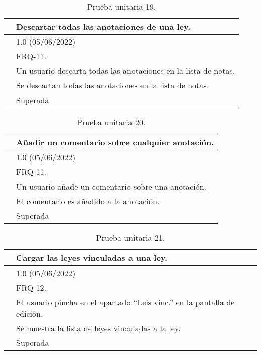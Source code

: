 \begin{table}[H]
\begin{center}
\begin{tabular}{|p{3cm}|p{10cm}|} \hline
\centering {\bf PU-19} & Descartar todas las anotaciones de una ley.  \\ \hline\hline
\centering {\bf Versión} & 1.0 (05/06/2022) \\ \hline
\centering {\bf Dependencias} & FRQ-11. \\ \hline
\centering {\bf Descripción} &  Un usuario descarta todas las anotaciones en la lista de notas. \\ \hline
\centering {\bf Criterio de aceptación} & Se descartan todas las anotaciones en la lista de notas. \\ \hline
\centering {\bf Estado} & Superada \\ \hline
\end{tabular}
\caption{Prueba unitaria 19.}
\label{enlacePU19}
\end{center}
\end{table}

\begin{table}[H]
\begin{center}
\begin{tabular}{|p{3cm}|p{10cm}|} \hline
\centering {\bf PU-20} & Añadir un comentario sobre cualquier anotación.  \\ \hline\hline
\centering {\bf Versión} & 1.0 (05/06/2022) \\ \hline
\centering {\bf Dependencias} & FRQ-11. \\ \hline
\centering {\bf Descripción} &  Un usuario añade un comentario sobre una anotación. \\ \hline
\centering {\bf Criterio de aceptación} & El comentario es añadido a la anotación. \\ \hline
\centering {\bf Estado} & Superada \\ \hline
\end{tabular}
\caption{Prueba unitaria 20.}
\label{enlacePU20}
\end{center}
\end{table}

\begin{table}[H]
\begin{center}
\begin{tabular}{|p{3cm}|p{10cm}|} \hline
\centering {\bf PU-21} & Cargar las leyes vinculadas a una ley.  \\ \hline\hline
\centering {\bf Versión} & 1.0 (05/06/2022) \\ \hline
\centering {\bf Dependencias} & FRQ-12. \\ \hline
\centering {\bf Descripción} &  El usuario pincha en el apartado ``Leis vinc.'' en la pantalla de edición. \\ \hline
\centering {\bf Criterio de aceptación} & Se muestra la lista de leyes vinculadas a la ley. \\ \hline
\centering {\bf Estado} & Superada \\ \hline
\end{tabular}
\caption{Prueba unitaria 21.}
\label{enlacePU21}
\end{center}
\end{table}

